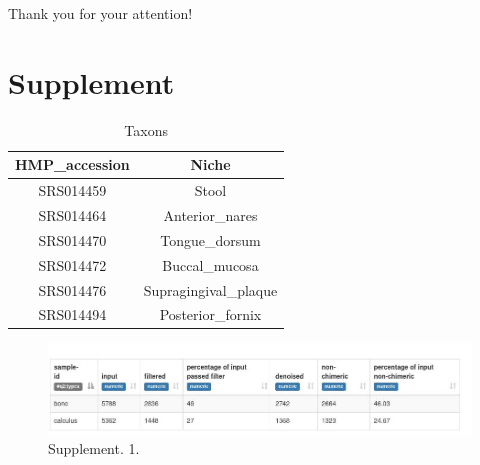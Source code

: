 \documentclass{article}
\begin{document}
Thank you for your attention!








\section{Supplement}

 
\begin{table}[h!]
	\centering
	\begin{tabular}{|c|c|}
		\hline
HMP_accession &	Niche   \\
\hline
SRS014459&	Stool 	   \\
\hline
SRS014464 &	Anterior_nares 	   \\
\hline
SRS014470 &	Tongue_dorsum 	   \\
\hline
SRS014472 & 	Buccal_mucosa 	   \\
\hline
SRS014476 &	Supragingival_plaque 	   \\
\hline 
SRS014494 &	Posterior_fornix \\ 
  	\hline	 

\end{tabular}
\caption{  Taxons }
\label{tab:var}
\end{table}

 \begin{figure}[h]
 	\centering
 	\includegraphics[scale=0.77]{supple}  
 	\caption{Supplement. 1. }
 	\label{heatmap11}
 \end{figure}
 
\end{document}
